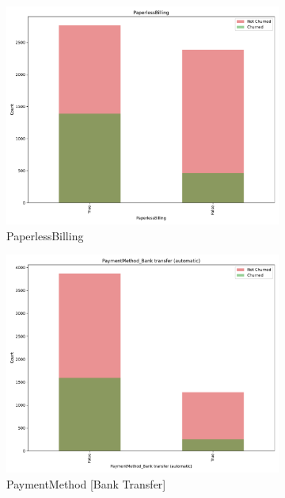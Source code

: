 \documentclass[a4paper,11pt]{article}
\begin{document}
\begin{landscape}
\begin{figure}
\begin{subfigure}{0.14\linewidth}
        \includegraphics[width=\linewidth]{figures/understanding/PaperlessBilling.pdf}
        \caption{PaperlessBilling}
    \end{subfigure}
    \begin{subfigure}{0.14\linewidth}
        \includegraphics[width=\linewidth]{figures/understanding/PaymentMethod_Bank transfer (automatic).pdf}
        \caption{PaymentMethod [Bank Transfer]}
    \end{subfigure}
    \begin{subfigure}{0.14\linewidth}

\end{subfigure}
\end{figure}
\end{landscape}
\end{document}
